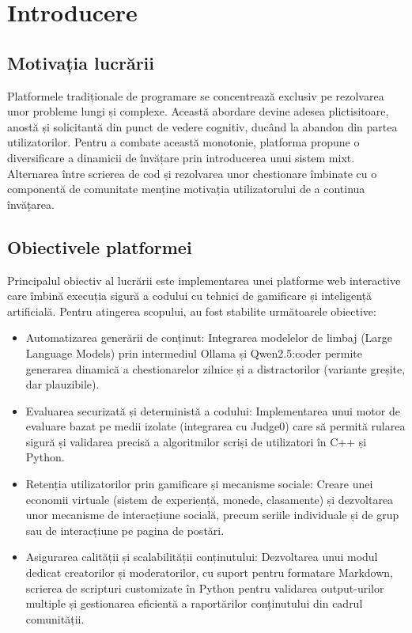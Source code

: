 \chapter{Introducere}

\section{Motivația lucrării}

Platformele tradiționale de programare se concentrează exclusiv pe rezolvarea unor probleme lungi și complexe. Această abordare devine adesea plictisitoare, anostă și solicitantă din punct de vedere cognitiv, ducând la abandon din partea utilizatorilor. Pentru a combate această monotonie, platforma propune o diversificare a dinamicii de învățare prin introducerea unui sistem mixt. Alternarea între scrierea de cod și rezolvarea unor chestionare îmbinate cu o componentă de comunitate menține motivația utilizatorului de a continua învățarea. 

\section{Obiectivele platformei}

Principalul obiectiv al lucrării este implementarea unei platforme web interactive care îmbină execuția sigură a codului cu tehnici de gamificare și inteligență artificială. Pentru atingerea scopului, au fost stabilite următoarele obiective:
\begin{itemize}
    \item Automatizarea generării de conținut: Integrarea modelelor de limbaj (Large Language Models) prin intermediul Ollama și Qwen2.5:coder permite generarea dinamică a chestionarelor zilnice și a distractorilor (variante greșite, dar plauzibile).  
    \item Evaluarea securizată și deterministă a codului: Implementarea unui motor de evaluare bazat pe medii izolate (integrarea cu Judge0) care să permită rularea sigură și validarea precisă a algoritmilor scriși de utilizatori în C++ și Python.
    \item Retenția utilizatorilor prin gamificare și mecanisme sociale: Creare unei economii virtuale (sistem de experiență, monede, clasamente) și dezvoltarea unor mecanisme de interacțiune socială, precum seriile individuale și de grup sau de interacțiune pe pagina de postări.
    \item Asigurarea calității și scalabilității conținutului: Dezvoltarea unui modul dedicat creatorilor și moderatorilor, cu suport pentru formatare Markdown, scrierea de scripturi customizate în Python pentru validarea output-urilor multiple și gestionarea eficientă a raportărilor conținutului din cadrul comunității.
\end{itemize}

